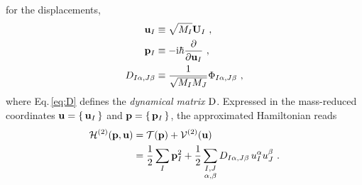  for the displacements,
\begin{align}
	{\bf u}_I 
		&\equiv \sqrt{M_I} {\bf U}_I~, 
		\label{eq:uI} \\
	{\bf p}_I 
		&\equiv -\im \hbar \frac{\partial}{\partial {\bf u}_I}~,
		\label{eq:pI} \\
	D_{I \alpha, J \beta}
		&\equiv \frac{1}{\sqrt{M_I M_J}} 
		\Phi_{I \alpha, J \beta}~,
		\label{eq:D}
\end{align}
where Eq.\,\eqref{eq:D} defines the \emph{dynamical matrix} $\rm D$.
Expressed in the mass-reduced coordinates ${\bf u} = \set{{\bf u}_I}$ and ${\bf p} = \set{{\bf p}_I}$, the approximated Hamiltonian reads
\begin{align}
	\begin{split}
		\mathcal{H}^{(2)}({\bf p}, {\bf u})
			&= \mathcal T ({\bf p}) + \mathcal{V}^{(2)} ({\bf u})\\
			&= \halb \sum_I {\bf p}_I^2 + 
				\halb \sum_{\substack{I, J \\ \alpha, \beta}}
					D_{I \alpha, J \beta}
					\, u_I^\alpha u_J^\beta~.
	\end{split}
	\label{eq:ha.H1}
\end{align}

